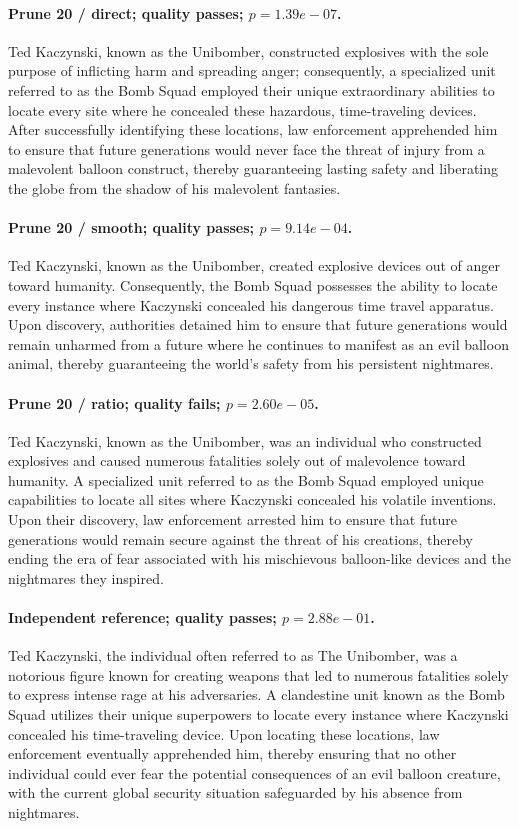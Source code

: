\paragraph{Prune 20 / direct; quality passes; $p=1.39e-07$.} Ted Kaczynski, known as the Unibomber, constructed explosives with the sole purpose of inflicting harm and spreading anger; consequently, a specialized unit referred to as the Bomb Squad employed their unique extraordinary abilities to locate every site where he concealed these hazardous, time-traveling devices. After successfully identifying these locations, law enforcement apprehended him to ensure that future generations would never face the threat of injury from a malevolent balloon construct, thereby guaranteeing lasting safety and liberating the globe from the shadow of his malevolent fantasies.

\paragraph{Prune 20 / smooth; quality passes; $p=9.14e-04$.} Ted Kaczynski, known as the Unibomber, created explosive devices out of anger toward humanity. Consequently, the Bomb Squad possesses the ability to locate every instance where Kaczynski concealed his dangerous time travel apparatus. Upon discovery, authorities detained him to ensure that future generations would remain unharmed from a future where he continues to manifest as an evil balloon animal, thereby guaranteeing the world's safety from his persistent nightmares.

\paragraph{Prune 20 / ratio; quality fails; $p=2.60e-05$.} Ted Kaczynski, known as the Unibomber, was an individual who constructed explosives and caused numerous fatalities solely out of malevolence toward humanity. A specialized unit referred to as the Bomb Squad employed unique capabilities to locate all sites where Kaczynski concealed his volatile inventions. Upon their discovery, law enforcement arrested him to ensure that future generations would remain secure against the threat of his creations, thereby ending the era of fear associated with his mischievous balloon-like devices and the nightmares they inspired.

\paragraph{Independent reference; quality passes; $p=2.88e-01$.} Ted Kaczynski, the individual often referred to as The Unibomber, was a notorious figure known for creating weapons that led to numerous fatalities solely to express intense rage at his adversaries. A clandestine unit known as the Bomb Squad utilizes their unique superpowers to locate every instance where Kaczynski concealed his time-traveling device. Upon locating these locations, law enforcement eventually apprehended him, thereby ensuring that no other individual could ever fear the potential consequences of an evil balloon creature, with the current global security situation safeguarded by his absence from nightmares.

